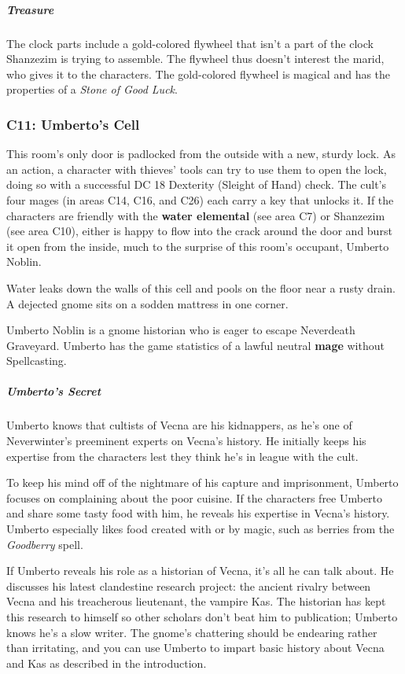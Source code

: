 \documentclass[10pt,a4paper,twoside,bg=print,twocolumn,openany,nodeprecatedcode]{dndbook}
\begin{document}
\subparagraph{Treasure}
The clock parts include a gold-colored flywheel that isn't a part of the clock Shanzezim is trying to assemble. The flywheel thus doesn't interest the marid, who gives it to the characters. The gold-colored flywheel is magical and has the properties of a \textit{Stone of Good Luck}.

\subsubsection{C11: Umberto's Cell}
This room's only door is padlocked from the outside with a new, sturdy lock. As an action, a character with thieves' tools can try to use them to open the lock, doing so with a successful DC 18 Dexterity (Sleight of Hand) check. The cult's four mages (in areas C14, C16, and C26) each carry a key that unlocks it. If the characters are friendly with the \textbf{water elemental} (see area C7) or Shanzezim (see area C10), either is happy to flow into the crack around the door and burst it open from the inside, much to the surprise of this room's occupant, Umberto Noblin.

\begin{DndReadAloud}{}
Water leaks down the walls of this cell and pools on the floor near a rusty drain. A dejected gnome sits on a sodden mattress in one corner.

\end{DndReadAloud}

Umberto Noblin is a gnome historian who is eager to escape Neverdeath Graveyard. Umberto has the game statistics of a lawful neutral \textbf{mage} without Spellcasting.

\subparagraph{Umberto's Secret}
Umberto knows that cultists of Vecna are his kidnappers, as he's one of Neverwinter's preeminent experts on Vecna's history. He initially keeps his expertise from the characters lest they think he's in league with the cult.

To keep his mind off of the nightmare of his capture and imprisonment, Umberto focuses on complaining about the poor cuisine. If the characters free Umberto and share some tasty food with him, he reveals his expertise in Vecna's history. Umberto especially likes food created with or by magic, such as berries from the \textit{Goodberry} spell.

If Umberto reveals his role as a historian of Vecna, it's all he can talk about. He discusses his latest clandestine research project: the ancient rivalry between Vecna and his treacherous lieutenant, the vampire Kas. The historian has kept this research to himself so other scholars don't beat him to publication; Umberto knows he's a slow writer. The gnome's chattering should be endearing rather than irritating, and you can use Umberto to impart basic history about Vecna and Kas as described in the introduction.
\end{document}
